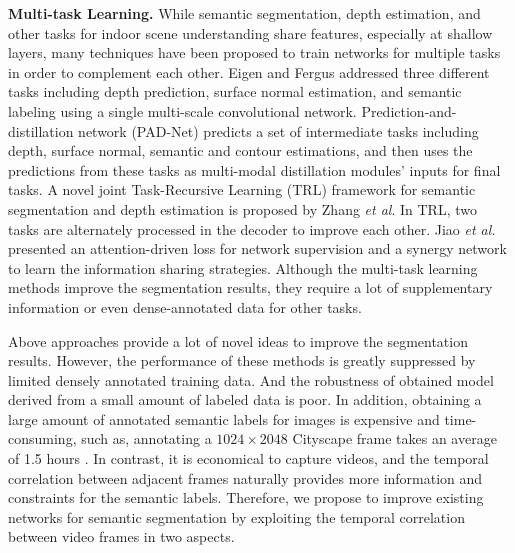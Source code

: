  
\noindent \textbf{Multi-task Learning.} 
%
While semantic segmentation, depth estimation, and other tasks for indoor scene understanding share features, especially at shallow layers, many techniques have been proposed to train networks for multiple tasks in order to complement each other.
%
Eigen and Fergus \cite{Eigen2015} addressed three different tasks including depth prediction, surface normal estimation, and semantic labeling using a single multi-scale convolutional network. 
%
Prediction-and-distillation network (PAD-Net)\cite{Xu2018} predicts a set of intermediate tasks including depth, surface normal, semantic and contour estimations, and then uses the predictions from these tasks as multi-modal distillation modules' inputs for final tasks.  
%
A novel joint Task-Recursive Learning (TRL) \cite{Zhang2018} framework for semantic segmentation and depth estimation is proposed by Zhang \emph{et al}. 
%
In TRL, two tasks are alternately processed in the decoder to improve each other.
% 
Jiao \emph{et al.} \cite{Jiao2018} presented an attention-driven loss for network supervision and a synergy network to learn the information sharing strategies. 
%
%
Although the multi-task learning methods improve the segmentation results, they require a lot of supplementary information or even dense-annotated data for other tasks.

Above approaches provide a lot of novel ideas to improve the segmentation results. However, the performance of these methods is greatly suppressed by limited densely annotated training data.
%
And the robustness of obtained model derived from a small amount of labeled data is poor.
%
In addition, obtaining a large amount of annotated semantic labels for images is expensive and time-consuming, such as, annotating a $1024\times2048$ Cityscape frame takes an average of 1.5 hours \cite{cordts2016cityscapes}.
% 
In contrast, it is economical to capture videos, and the temporal correlation between adjacent frames naturally provides more information and constraints for the semantic labels. 
%
Therefore, we propose to improve existing networks for semantic segmentation by exploiting the temporal correlation between video frames in two aspects.

